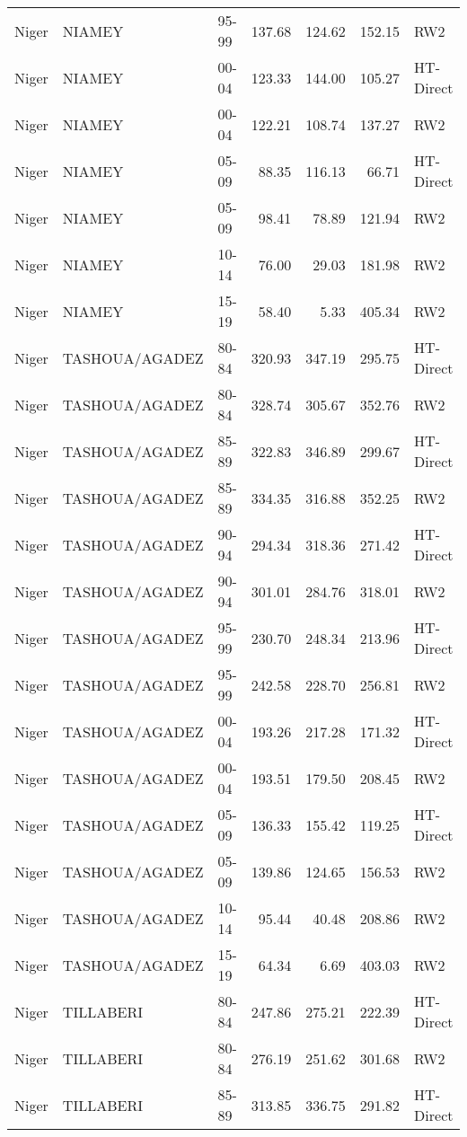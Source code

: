 \begin{longtable}{lllrrrl}
  Niger & NIAMEY & 95-99 & 137.68 & 124.62 & 152.15 & RW2 \\ 
  Niger & NIAMEY & 00-04 & 123.33 & 144.00 & 105.27 & HT-Direct \\ 
  Niger & NIAMEY & 00-04 & 122.21 & 108.74 & 137.27 & RW2 \\ 
  Niger & NIAMEY & 05-09 & 88.35 & 116.13 & 66.71 & HT-Direct \\ 
  Niger & NIAMEY & 05-09 & 98.41 & 78.89 & 121.94 & RW2 \\ 
  Niger & NIAMEY & 10-14 & 76.00 & 29.03 & 181.98 & RW2 \\ 
  Niger & NIAMEY & 15-19 & 58.40 & 5.33 & 405.34 & RW2 \\ 
  Niger & TASHOUA/AGADEZ & 80-84 & 320.93 & 347.19 & 295.75 & HT-Direct \\ 
  Niger & TASHOUA/AGADEZ & 80-84 & 328.74 & 305.67 & 352.76 & RW2 \\ 
  Niger & TASHOUA/AGADEZ & 85-89 & 322.83 & 346.89 & 299.67 & HT-Direct \\ 
  Niger & TASHOUA/AGADEZ & 85-89 & 334.35 & 316.88 & 352.25 & RW2 \\ 
  Niger & TASHOUA/AGADEZ & 90-94 & 294.34 & 318.36 & 271.42 & HT-Direct \\ 
  Niger & TASHOUA/AGADEZ & 90-94 & 301.01 & 284.76 & 318.01 & RW2 \\ 
  Niger & TASHOUA/AGADEZ & 95-99 & 230.70 & 248.34 & 213.96 & HT-Direct \\ 
  Niger & TASHOUA/AGADEZ & 95-99 & 242.58 & 228.70 & 256.81 & RW2 \\ 
  Niger & TASHOUA/AGADEZ & 00-04 & 193.26 & 217.28 & 171.32 & HT-Direct \\ 
  Niger & TASHOUA/AGADEZ & 00-04 & 193.51 & 179.50 & 208.45 & RW2 \\ 
  Niger & TASHOUA/AGADEZ & 05-09 & 136.33 & 155.42 & 119.25 & HT-Direct \\ 
  Niger & TASHOUA/AGADEZ & 05-09 & 139.86 & 124.65 & 156.53 & RW2 \\ 
  Niger & TASHOUA/AGADEZ & 10-14 & 95.44 & 40.48 & 208.86 & RW2 \\ 
  Niger & TASHOUA/AGADEZ & 15-19 & 64.34 & 6.69 & 403.03 & RW2 \\ 
  Niger & TILLABERI & 80-84 & 247.86 & 275.21 & 222.39 & HT-Direct \\ 
  Niger & TILLABERI & 80-84 & 276.19 & 251.62 & 301.68 & RW2 \\ 
  Niger & TILLABERI & 85-89 & 313.85 & 336.75 & 291.82 & HT-Direct \\ 

\end{longtable}
